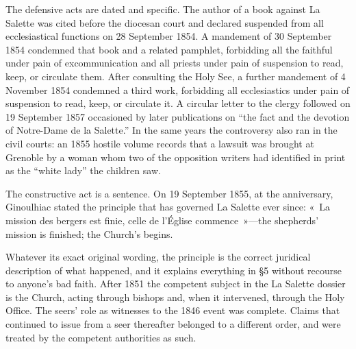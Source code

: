 The defensive acts are dated and specific. The author of a book
against La Salette was cited before the diocesan court and declared
suspended from all ecclesiastical functions on 28 September 1854. A
mandement of 30 September 1854 condemned that book and a related
pamphlet, forbidding all the faithful under pain of excommunication
and all priests under pain of  suspension to read,
keep, or circulate them. After consulting the Holy See, a further
mandement of 4 November 1854 condemned a third work, forbidding all
ecclesiastics under pain of suspension to read, keep, or circulate
it. A circular letter to the clergy followed on 19 September 1857
occasioned by later publications on ``the fact and the devotion of
Notre-Dame de la Salette.'' In the same years the controversy also
ran in the civil courts: an 1855 hostile volume records that a
lawsuit was brought at Grenoble by a woman whom two of the
opposition writers had identified in print as the ``white lady'' the
children saw.

The constructive act is a sentence. On 19 September 1855, at the
anniversary, Ginoulhiac stated the principle that has governed La
Salette ever since: «~La mission des bergers est finie, celle de
l'Église commence~»---the shepherds' mission is finished; the
Church's begins.

Whatever its exact original wording, the principle is the correct
juridical description of what happened, and it explains everything in
\S5 without recourse to anyone's bad faith. After 1851 the competent
subject in the La Salette dossier is the Church, acting through
bishops and, when it intervened, through the Holy Office. The seers'
role as witnesses to the 1846 event was complete. Claims that
continued to issue from a seer thereafter belonged to a different
order, and were treated by the competent authorities as such.
